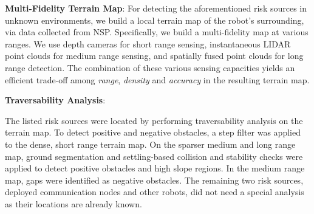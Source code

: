 \documentclass[letterpaper, 10pt, conference]{ieeeconf}      %
\newcommand{\ph}[1]{{\textbf{#1}:}} %
\newcommand{\rev}[1]{{\color{blue} #1 }} %
\begin{document}
\ph{Multi-Fidelity Terrain Map}
For detecting the aforementioned risk sources in unknown environments, we build a local terrain map of the robot's surrounding, via data collected from NSP. %
Specifically, we build a multi-fidelity map at various ranges. We use depth cameras for short range sensing, %
instantaneous LIDAR point clouds for medium range sensing, %
and spatially fused point clouds \cite{oleynikova2017voxblox} for long range detection. %
The combination of these various sensing capacities yields an efficient trade-off among \emph{range}, \emph{density} and \emph{accuracy} in the resulting terrain map.

\rev{\ph{Traversability Analysis}}

The listed risk sources were located by performing traversability analysis on the terrain map.
To detect positive and negative obstacles, a step filter was applied to the dense, short range terrain map. 
On the sparser medium and long range map, ground segmentation \cite{himmelsbach2010fast} and settling-based collision and stability checks \cite{krusi2017driving} were applied to detect positive obstacles and high slope regions.
In the medium range map, gaps were identified as negative obstacles.
The remaining two risk sources, deployed communication nodes and other robots, did not need a special analysis as their locations are already known.
\end{document}
